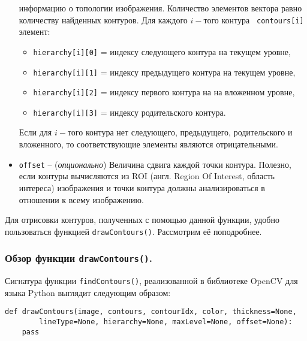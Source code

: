 \begin{itemize}
информацию о топологии изображения. Количество элементов вектора равно
количеству найденных контуров. Для каждого $i-$того контура {\tt
contours[i]} элемент:
		\begin{itemize}
			\item {\tt hierarchy[i][0]} = индексу следующего контура 
на текущем уровне, 
			\item {\tt hierarchy[i][1]} = индексу предыдущего контура
на текущем уровне,
			\item {\tt hierarchy[i][2]} = индексу первого контура на
на вложенном уровне,
			\item {\tt hierarchy[i][3]} = индексу родительского
контура.
		\end{itemize}
Если для $i-$того контура нет следующего, предыдущего, родительского 
и вложенного, то соответствующие элементы являются
отрицательными.
	\item {\tt offset} -- ({\it опционально}) Величина сдвига каждой
точки контура. Полезно, если контуры вычисляются из ROI (англ. Region
Of Interest, область интереса) изображения и точки контура должны 
анализироваться в отношении к всему изображению.

\end{itemize}

Для отрисовки контуров, полученных с помощью данной функции, удобно
пользоваться функцией {\tt drawContours()}. Рассмотрим её поподробнее.

\subsubsection{Обзор функции {\tt drawContours()}.}

Сигнатура функции {\tt findContours()}, реализованной в библиотеке
OpenCV для языка Python выглядит следующим образом:

\begin{verbatim}
def drawContours(image, contours, contourIdx, color, thickness=None,
		lineType=None, hierarchy=None, maxLevel=None, offset=None):
	pass
\end{verbatim}

